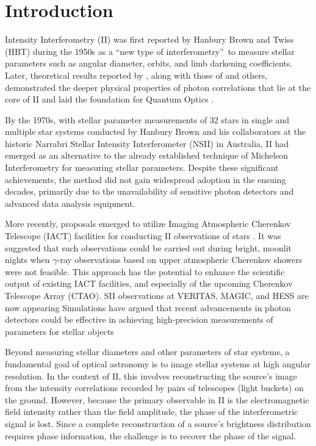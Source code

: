\section{Introduction}

Intensity Interferometry (II) was first reported by Hanbury Brown and Twiss (HBT) during the 1950s \citep{brown1954lxxiv, HBT56} as a \textquotedblleft new type of interferometry\textquotedblright\ to measure stellar parameters such as angular diameter, orbits, and limb darkening coefficients. Later, theoretical results reported by \cite{brown1957interferometry, brown1958interferometry}, along with those of \cite{glauber1963quantum} and others, demonstrated the deeper physical properties of photon correlations that lie at the core of II and laid the foundation for Quantum Optics \cite[for textbook treatments see][]{MandelWolf1995, Hecht2002}.

By the 1970s, with stellar parameter measurements of 32 stars in single and multiple star systems conducted by Hanbury Brown and his collaborators \citep{hanbury1974angular} at the historic Narrabri Stellar Intensity Interferometer (NSII) in Australia, II had emerged as an alternative to the already established technique of Michelson Interferometry for measuring stellar parameters. Despite these significant achievements, the method did not gain widespread adoption in the ensuing decades, primarily due to the unavailability of sensitive photon detectors and advanced data analysis equipment.

More recently, proposals emerged to utilize Imaging Atmospheric Cherenkov Telescope (IACT) facilities for conducting II observations of stars \citep{LeBohec2006, nunez2010stellar, nunez2012high, 2013APh....43..331D}. It was suggested that such observations could be carried out during bright, moonlit nights when $\gamma$-ray observations based on upper atmospheric Cherenkov showers were not feasible. This approach has the potential to enhance the scientific output of existing IACT facilities, and especially of the upcoming Cherenkov Telescope Array (CTAO).  SII observations at VERITAS, MAGIC, and HESS are now appearing
\citep[e.g.,][]{2024ApJ...966...28A,2024MNRAS.529.4387A,2025MNRAS.537.2334V}
Simulations \citep[e.g.,][]{10.1093/mnras/stab2391, 10.1093/mnras/stac2433} have argued that recent advancements in photon detectors could be effective in achieving high-precision measurements of parameters for stellar objects 

Beyond measuring stellar diameters and other parameters of star systems, a fundamental goal of optical astronomy is to image stellar systems at high angular resolution.  In the context of II, this involves reconstructing the source's image from the intensity correlations recorded by pairs of telescopes (light buckets) on the ground. However, because the primary observable in II is the electromagnetic field intensity rather than the field amplitude, the phase of the interferometric signal is lost. Since a complete reconstruction of a source's brightness distribution requires phase information, the challenge is to recover the phase of the signal.

